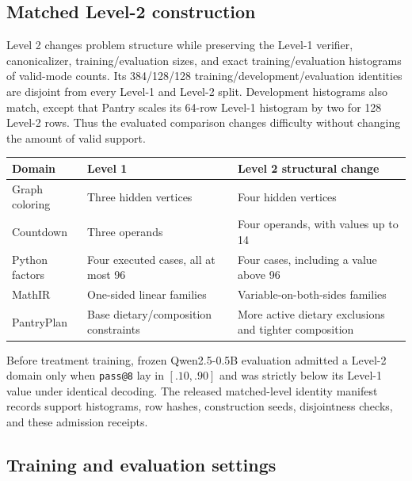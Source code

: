 \subsection{Matched Level-2 construction}
\label{app:data-levels}

Level 2 changes problem structure while preserving the Level-1 verifier,
canonicalizer, training/evaluation sizes, and exact training/evaluation
histograms of valid-mode counts. Its 384/128/128
training/development/evaluation identities are disjoint from every Level-1
and Level-2 split. Development histograms also match, except that Pantry
scales its 64-row Level-1 histogram by two for 128 Level-2 rows. Thus the
evaluated comparison changes difficulty without changing the amount of
valid support.

\begin{center}
\small
\begin{tabularx}{.96\linewidth}{@{}lYY@{}}
\toprule
\textbf{Domain} & \textbf{Level 1} & \textbf{Level 2 structural change} \\
\midrule
Graph coloring & Three hidden vertices & Four hidden vertices \\
Countdown & Three operands & Four operands, with values up to 14 \\
Python factors & Four executed cases, all at most 96 & Four cases, including a value above 96 \\
MathIR & One-sided linear families & Variable-on-both-sides families \\
PantryPlan & Base dietary/composition constraints & More active dietary exclusions and tighter composition \\
\bottomrule
\end{tabularx}
\end{center}

Before treatment training, frozen Qwen2.5-0.5B evaluation admitted a Level-2
domain only when \texttt{pass@8} lay in $[.10,.90]$ and was strictly below
its Level-1 value under identical decoding. The released matched-level
identity manifest records support histograms, row hashes, construction
seeds, disjointness checks, and these admission receipts.

\subsection{Training and evaluation settings}
\label{app:repro-run-contract}
\label{app:comparison-design}

